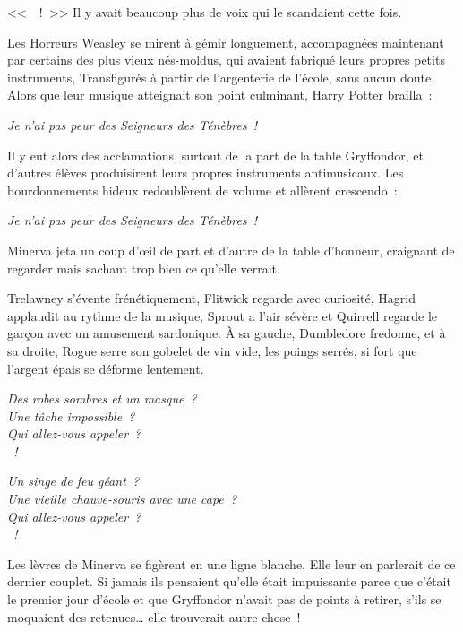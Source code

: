 {<<~~!~>> Il y avait beaucoup plus de voix qui le scandaient cette fois.

Les Horreurs Weasley se mirent à gémir longuement, accompagnées maintenant par certains des plus vieux nés-moldus, qui avaient fabriqué leurs propres petits instruments, Transfigurés à partir de l'argenterie de l'école, sans aucun doute. Alors que leur musique atteignait son point culminant, Harry Potter brailla~:

\begin{center}
\emph{Je n'ai pas peur des Seigneurs des Ténèbres~!}
\end{center}

Il y eut alors des acclamations, surtout de la part de la table Gryffondor, et d'autres élèves produisirent leurs propres instruments antimusicaux. Les bourdonnements hideux redoublèrent de volume et allèrent crescendo~:

\begin{center}
\emph{Je n'ai pas peur des Seigneurs des Ténèbres~!}
\end{center}

Minerva jeta un coup d'œil de part et d'autre de la table d'honneur, craignant de regarder mais sachant trop bien ce qu'elle verrait.

Trelawney s'évente frénétiquement, Flitwick regarde avec curiosité, Hagrid applaudit au rythme de la musique, Sprout a l'air sévère et Quirrell regarde le garçon avec un amusement sardonique. À sa gauche, Dumbledore fredonne, et à sa droite, Rogue serre son gobelet de vin vide, les poings serrés, si fort que l'argent épais se déforme lentement.

\begin{center}
\emph{Des robes sombres et un masque~?\\
Une tâche impossible~?\\
Qui allez-vous appeler~?\\
~!}

\emph{Un singe de feu géant~?\\
Une vieille chauve-souris avec une cape~?\\
Qui allez-vous appeler~?\\
~!}
\end{center}

Les lèvres de Minerva se figèrent en une ligne blanche. Elle leur en parlerait de ce dernier couplet. Si jamais ils pensaient qu'elle était impuissante parce que c'était le premier jour d'école et que Gryffondor n'avait pas de points à retirer, s'ils se moquaient des retenues… elle trouverait autre chose~!

}
